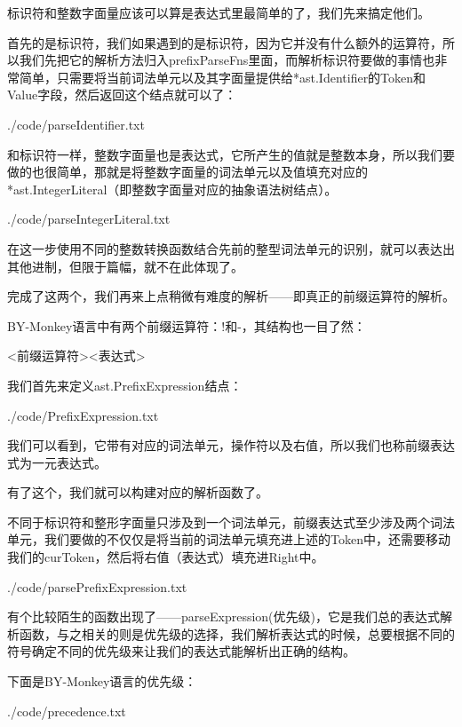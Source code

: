 \documentclass{beamer}
\begin{document}
	\begin{frame}
		标识符和整数字面量应该可以算是表达式里最简单的了，我们先来搞定他们。
		
		首先的是标识符，我们如果遇到的是标识符，因为它并没有什么额外的运算符，所以我们先把它的解析方法归入prefixParseFns里面，而解析标识符要做的事情也非常简单，只需要将当前词法单元以及其字面量提供给*ast.Identifier的Token和Value字段，然后返回这个结点就可以了：
		
		
		{./code/parseIdentifier.txt}	
		
	\end{frame}
	\begin{frame}
		和标识符一样，整数字面量也是表达式，它所产生的值就是整数本身，所以我们要做的也很简单，那就是将整数字面量的词法单元以及值填充对应的*ast.IntegerLiteral（即整数字面量对应的抽象语法树结点）。
		
		
		{./code/parseIntegerLiteral.txt}
		
		在这一步使用不同的整数转换函数结合先前的整型词法单元的识别，就可以表达出其他进制，但限于篇幅，就不在此体现了。
	\end{frame}
	\begin{frame}
		完成了这两个，我们再来上点稍微有难度的解析——即真正的前缀运算符的解析。
		
		BY-Monkey语言中有两个前缀运算符：!和-，其结构也一目了然：
		
		<前缀运算符><表达式>
		
		我们首先来定义ast.PrefixExpression结点：
		
		
		{./code/PrefixExpression.txt}
		
		我们可以看到，它带有对应的词法单元，操作符以及右值，所以我们也称前缀表达式为一元表达式。
		
		有了这个，我们就可以构建对应的解析函数了。
	\end{frame}
	
	\begin{frame}
		不同于标识符和整形字面量只涉及到一个词法单元，前缀表达式至少涉及两个词法单元，我们要做的不仅仅是将当前的词法单元填充进上述的Token中，还需要移动我们的curToken，然后将右值（表达式）填充进Right中。
		
		
		{./code/parsePrefixExpression.txt}
	\end{frame}

	\begin{frame}
		有个比较陌生的函数出现了——parseExpression(优先级)，它是我们总的表达式解析函数，与之相关的则是优先级的选择，我们解析表达式的时候，总要根据不同的符号确定不同的优先级来让我们的表达式能解析出正确的结构。
		
		下面是BY-Monkey语言的优先级：
		
		
		{./code/precedence.txt}
	\end{frame}
\end{document}
